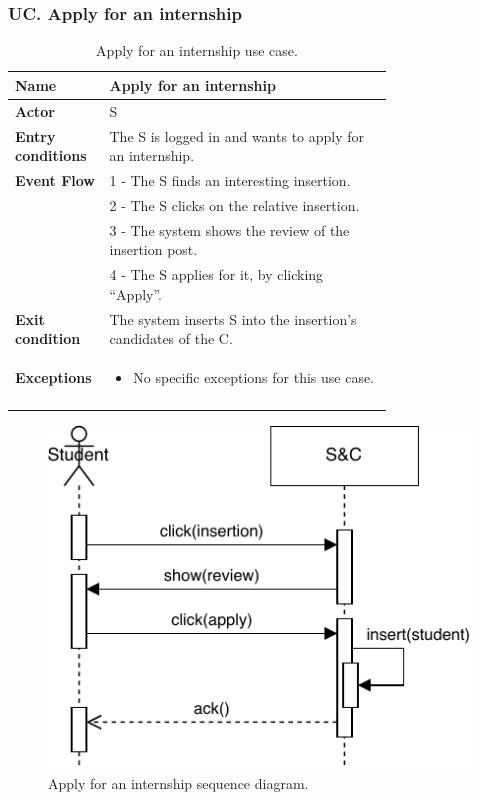 \subsubsection*{UC\cuc . Apply for an internship}
\begin{center}
    \begin{longtable}{|l|p{0.75\linewidth}|}
        \hline
        \textbf{Name}               & Apply for an internship\\
        \hline
        \textbf{Actor}              & S\\
        \hline
        \textbf{Entry conditions}   & The S is logged in and wants to apply for an internship.\\
        \hline
        \textbf{Event Flow}         & 1 - The S finds an interesting insertion. \\
        & 2 - The S clicks on the relative insertion. \\
        & 3 - The system shows the review of the insertion post. \\
        & 4 - The S applies for it, by clicking “Apply”. \\
        \hline
        \textbf{Exit condition}   & The system inserts S into the insertion’s candidates of the C. \\       
        \hline
        \textbf{Exceptions}       & \begin{itemize}
            \item No specific exceptions for this use case.
        \end{itemize}\\
        \hline
        \caption{Apply for an internship use case.}
        \label{tab: apply_for_an_internship_use_case}
    \end{longtable}
\end{center}


\begin{figure}[H]
    \begin{center}
        \includegraphics[width=0.6\linewidth]{Images/SequenceDiagram/ApplySD.pdf}
        \caption{Apply for an internship sequence diagram.}
        \label{fig:apply_for_an_internship_seqdiag}%
    \end{center}
\end{figure}


